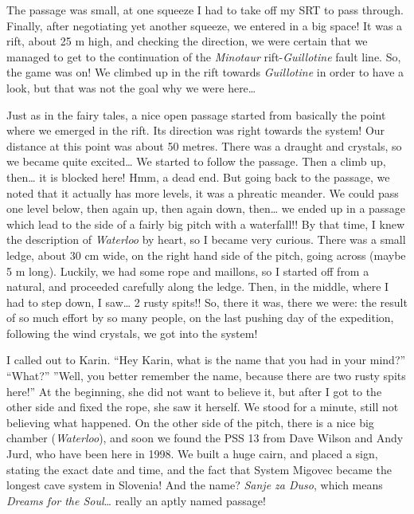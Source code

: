 The passage was small, at one squeeze I had to take off my SRT to pass
through. Finally, after negotiating yet another squeeze, we entered in a
big space! It was a rift, about 25 m high, and checking the direction,
we were certain that we managed to get to the continuation of the
\emph{Minotaur} rift-\emph{Guillotine} fault line. So, the game was on!
We climbed up in the rift towards \emph{Guillotine} in order to have a
look, but that was not the goal why we were here\ldots{}

Just as in the fairy tales, a nice open passage started from basically
the point where we emerged in the rift. Its direction was right towards
the system! Our distance at this point was about 50 metres. There was a
draught and crystals, so we became quite excited\ldots{} We started to
follow the passage. Then a climb up, then\ldots{} it is blocked here!
Hmm, a dead end. But going back to the passage, we noted that it
actually has more levels, it was a phreatic meander. We could pass one
level below, then again up, then again down, then\ldots{} we ended up in
a passage which lead to the side of a fairly big pitch with a
waterfall!! By that time, I knew the description of \emph{Waterloo} by
heart, so I became very curious. There was a small ledge, about 30 cm
wide, on the right hand side of the pitch, going across (maybe 5 m
long). Luckily, we had some rope and maillons, so I started off from a
natural, and proceeded carefully along the ledge. Then, in the middle,
where I had to step down, I saw\ldots{} 2 rusty spits!! So, there it
was, there we were: the result of so much effort by so many people, on
the last pushing day of the expedition, following the wind crystals, we
got into the system!

I called out to Karin. ``Hey Karin, what is the name that you had in
your mind?'' ``What?'' ''Well, you better remember the name, because
there are two rusty spits here!'' At the beginning, she did not want to
believe it, but after I got to the other side and fixed the rope, she
saw it herself. We stood for a minute, still not believing what
happened. On the other side of the pitch, there is a nice big chamber
(\emph{Waterloo}), and soon we found the PSS 13 from Dave Wilson and
Andy Jurd, who have been here in 1998. We built a huge cairn, and placed
a sign, stating the exact date and time, and the fact that System
Migovec became the longest cave system in Slovenia! And the name?
\emph{Sanje za Duso}, which means \emph{Dreams for the Soul}\ldots{}
really an aptly named passage!

